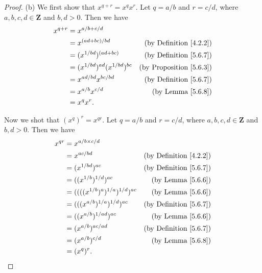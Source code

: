 \begin{proof}{(b)}
    We first show that \(x^{q + r} = x^q x^r\).
    Let \(q = a / b\) and \(r = c / d\), where \(a, b, c, d \in \mathbf{Z}\) and \(b, d > 0\).
    Then we have
    \begin{align*}
        x^{q + r} & = x^{a / b + c / d}                                                         \\
                  & = x^{(ad + bc) / bd}                  & \text{(by Definition \ref{4.2.2})}  \\
                  & = (x^{1 / bd})^{(ad + bc)}            & \text{(by Definition \ref{5.6.7})}  \\
                  & = (x^{1 / bd})^{ad} (x^{1 / bd})^{bc} & \text{(by Proposition \ref{5.6.3})} \\
                  & = x^{ad / bd} x^{bc / bd}             & \text{(by  Definition \ref{5.6.7})} \\
                  & = x^{a / b} x^{c / d}                 & \text{(by Lemma \ref{5.6.8})}       \\
                  & = x^q x^r.
    \end{align*}

    Now we shot that \((x^q)^r = x^{qr}\).
    Let \(q = a / b\) and \(r = c / d\), where \(a, b, c, d \in \mathbf{Z}\) and \(b, d > 0\).
    Then we have
    \begin{align*}
        x^{qr} & = x^{a / b \times c / d}                                                        \\
               & = x^{ac / bd}                              & \text{(by Definition \ref{4.2.2})} \\
               & = (x^{1 / bd})^{ac}                        & \text{(by Definition \ref{5.6.7})} \\
               & = ((x^{1 / b})^{1 / d})^{ac}               & \text{(by Lemma \ref{5.6.6})}      \\
               & = ((((x^{1 / b})^a)^{1 / a})^{1 / d})^{ac} & \text{(by Lemma \ref{5.6.6})}      \\
               & = (((x^{a / b})^{1 / a})^{1 / d})^{ac}     & \text{(by Definition \ref{5.6.7})} \\
               & = ((x^{a / b})^{1 / ad})^{ac}              & \text{(by Lemma \ref{5.6.6})}      \\
               & = (x^{a / b})^{ac / ad}                    & \text{(by Definition \ref{5.6.7})} \\
               & = (x^{a / b})^{c / d}                      & \text{(by Lemma \ref{5.6.8})}      \\
               & = (x^q)^r.
    \end{align*}
\end{proof}

